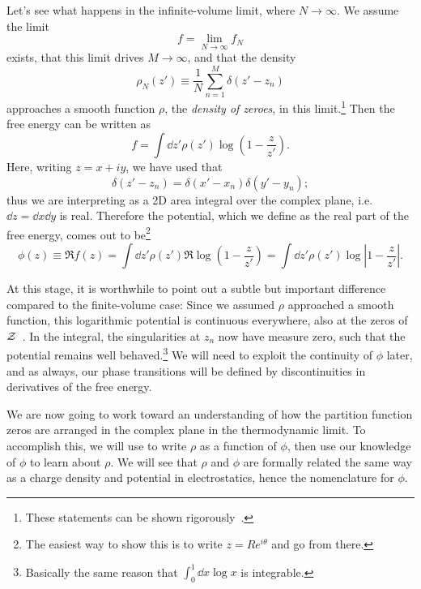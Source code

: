 Let's see what happens
in the infinite-volume limit, where $N\to\infty$. We assume the limit
\begin{equation}
f=\lim_{N\to\infty} f_N
\end{equation} 
exists, that this limit drives $M\to\infty$, and that the density
\begin{equation}
\rho_N(z')\equiv\frac{1}{N}\sum_{n=1}^M\delta(z'-z_n)
\end{equation}
approaches a smooth function $\rho$, the {\it density of zeroes}, in this limit.\footnote{These statements
can be shown rigorously~\cite{ruelle1999statistical}.}
Then the free energy can be written as
\begin{equation}\label{eq:densityZeroIntegral}
f=\int\dd{z'}\rho(z')\log\left(1-\frac{z}{z'}\right).
\end{equation}
Here, writing $z=x+iy$, we have used that
\begin{equation}
\delta(z'-z_n)=\delta(x'-x_n)\delta(y'-y_n);
\end{equation}
thus we are interpreting  as a 2D area integral
over the complex plane, i.e. $\dd{z}=\dd{x}\dd{y}$ is real. Therefore the 
potential, which we define as the real part of the free energy, comes out to 
be\footnote{The easiest way to show this is to write $z=Re^{i\theta}$ and go
from there.}
\begin{equation}\label{eq:LYpotential}
\phi(z)\equiv\Re f(z)
=\int\dd{z'}\rho(z')\Re\log\left(1-\frac{z}{z'}\right)
=\int\dd{z'}\rho(z')\log\left|1-\frac{z}{z'}\right|.
\end{equation}

At this stage, it is worthwhile to point out a subtle but important
difference compared to the finite-volume case: Since we assumed $\rho$
approached a smooth function, this logarithmic potential is continuous
everywhere, also at the zeros of $\mathcal{Z}$~\cite{KelloggPot}. In the integral,
the singularities at $z_n$ now have measure zero, such that the potential
remains well behaved.\footnote{Basically the same reason that
$\int_0^1\dd{x}\log{x}$ is integrable.}  
We will need to exploit the continuity of $\phi$ later, and as always, our
phase transitions will be defined by discontinuities in derivatives of
the free energy.

We are now going to work toward an understanding of how the partition function
zeros are arranged in the complex plane in the thermodynamic limit. To
accomplish this, we will use  to write $\rho$ as a
function of $\phi$, then use our knowledge of $\phi$ to learn about $\rho$.
We will see that $\rho$ and $\phi$ are formally related the same way as a charge
density and potential in electrostatics, hence the nomenclature for $\phi$.

